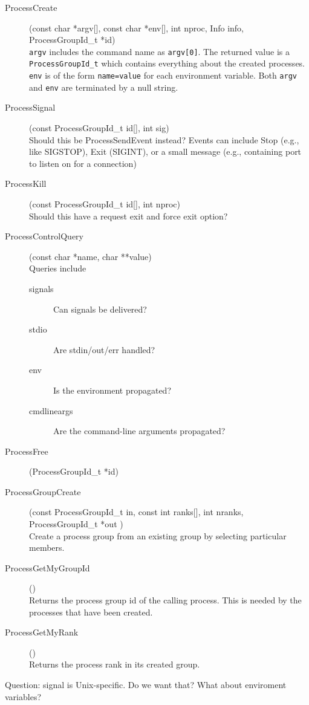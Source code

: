 \documentclass{article}
\let\code=\texttt
\begin{document}
\begin{description}
\item[ProcessCreate](const char *argv[], const char *env[], 
                     int nproc, Info info,
    ProcessGroupId\_t *id)\\
\code{argv} includes the command name as \code{argv[0]}.  The returned value
    is a \code{ProcessGroupId\_t} which contains everything about the created
    processes. 
    \code{env} is of the form \code{name=value} for each environment variable.
    Both \code{argv} and \code{env} are terminated by a null string.
\item[ProcessSignal](const ProcessGroupId\_t id[], int sig)\\
Should this be ProcessSendEvent instead?  Events can include Stop (e.g., like
SIGSTOP), Exit (SIGINT), or a small message (e.g., containing port to listen
on for a connection)
\item[ProcessKill](const ProcessGroupId\_t id[], int nproc)\\
Should this have a request exit and force exit option?
\item[ProcessControlQuery](const char *name, char **value)\\
      Queries include
      \begin{description}
      \item[signals]Can signals be delivered?
      \item[stdio]Are stdin/out/err handled?
      \item[env]Is the environment propagated?
      \item[cmdlineargs]Are the command-line arguments propagated?
      \end{description}
\item[ProcessFree](ProcessGroupId\_t *id)\\
\item[ProcessGroupCreate](const ProcessGroupId\_t in, const int ranks[], int
  nranks, ProcessGroupId\_t *out )\\
  Create a process group from an existing group by selecting particular
  members.
\item[ProcessGetMyGroupId]()\\
Returns the process group id of the calling process.  This is needed by the
processes that have been created.
\item[ProcessGetMyRank]()\\
Returns the process rank in its created group.
\end{description}
Question: signal is Unix-specific.  Do we want that?  What about enviroment
variables? 
\end{document}
